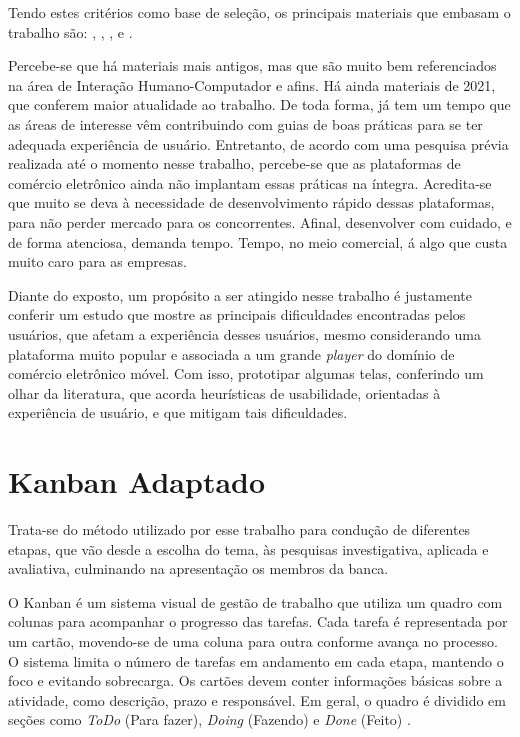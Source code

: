 Tendo estes critérios como base de seleção, os principais materiais que embasam o trabalho são: \cite{SudianaChandra}, \cite{LucasAlmeida}, \cite{GunawanRicky}, \cite{ECommerceOverview} e \cite{AttrakDiff}.

Percebe-se que há materiais mais antigos, mas que são muito bem referenciados na área de Interação Humano-Computador e afins. Há ainda materiais de 2021, que conferem maior atualidade ao trabalho. De toda forma, já tem um tempo que as áreas de interesse vêm contribuindo com guias de boas práticas para se ter adequada experiência de usuário. Entretanto, de acordo com uma pesquisa prévia realizada até o momento nesse trabalho, percebe-se que as plataformas de comércio eletrônico ainda não implantam essas práticas na íntegra. Acredita-se que muito se deva à necessidade de desenvolvimento rápido dessas plataformas, para não perder mercado para os concorrentes. Afinal, desenvolver com cuidado, e de forma atenciosa, demanda tempo. Tempo, no meio comercial, á algo que custa muito caro para as empresas. 

Diante do exposto, um propósito a ser atingido nesse trabalho é justamente conferir um estudo que mostre as principais dificuldades encontradas pelos usuários, que afetam a experiência desses usuários, mesmo considerando uma plataforma muito popular e associada a um grande \textit{player} do domínio de comércio eletrônico móvel. Com isso, prototipar algumas telas, conferindo um olhar da literatura, que acorda heurísticas de usabilidade, orientadas à experiência de usuário, e que mitigam tais dificuldades.


\section{Kanban Adaptado}
    \label{KanbanAdaptado}

Trata-se do método utilizado por esse trabalho para condução de diferentes etapas, que vão desde a escolha do tema, às pesquisas investigativa, aplicada e avaliativa, culminando na apresentação os membros da banca.

O Kanban é um sistema visual de gestão de trabalho que utiliza um quadro com colunas para acompanhar o progresso das tarefas. Cada tarefa é representada por um cartão, movendo-se de uma coluna para outra conforme avança no processo. O sistema limita o número de tarefas em andamento em cada etapa, mantendo o foco e evitando sobrecarga. Os cartões devem conter informações básicas sobre a atividade, como descrição, prazo e responsável. Em geral, o quadro é dividido em seções como  \textit{ToDo} (Para fazer), \textit{Doing} (Fazendo) e \textit{Done} (Feito) \cite{Kanban}.


